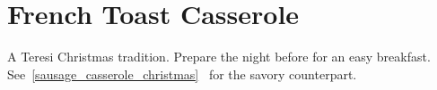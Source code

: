 \section{
    French Toast Casserole
}\label{french_toast_casserole_christmas}

\begin{recipestats}[
        servings=8,
        preptime=30 \minute,
        bakingtime=35 \minute,
        inactivetime=12 \hour,
        source=Mike \& Jane,
        original=Chris Berg \& Pam Teresi,
    ]
\end{recipestats}

\begin{recipeabstract}
    A Teresi Christmas tradition.
    Prepare the night before for an easy breakfast.
    See~\ref{sausage_casserole_christmas}~
    for the savory counterpart.
\end{recipeabstract}

\begin{ingredientcolumns}
    \begin{ingredientblock}
        \\
        \\
    \end{ingredientblock}

    \begin{ingredientblock}
        \\
        \\
        \\
    \end{ingredientblock}
\end{ingredientcolumns}

